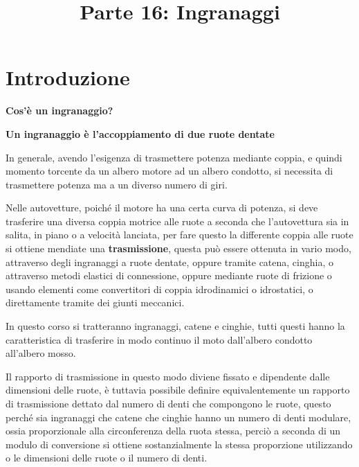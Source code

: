 \documentclass[a4paper, 15pt]{article}
\title{Parte 16: Ingranaggi}
\date{}
\begin{document}
		\maketitle
		\tableofcontents 
		\newpage
		
\section{Introduzione}		
\begin{adjustwidth}{2in}{} 
	\begin{center}
		\textbf{Cos'è un ingranaggio?}
	\end{center}  
	
	\begin{center}
		\textbf{Un ingranaggio è l'accoppiamento di due ruote dentate} \newline
	\end{center}
	
	In generale, avendo l'esigenza di trasmettere potenza mediante coppia, e quindi momento torcente da un albero motore ad un albero condotto, si necessita di trasmettere potenza ma a un diverso numero di giri. 
	
	Nelle autovetture, poiché il motore ha una certa curva di potenza, si deve trasferire una diversa coppia motrice alle ruote a seconda che l'autovettura sia in salita, in piano o a velocità lanciata, per fare questo la differente coppia alle ruote si ottiene mendiate una \textbf{trasmissione}, questa può essere ottenuta in vario modo, attraverso degli ingranaggi a ruote dentate, oppure tramite catena, cinghia, o attraverso metodi elastici di connessione, oppure mediante ruote di frizione o usando elementi come convertitori di coppia idrodinamici o idrostatici, o direttamente tramite dei giunti meccanici.\newline
	
	In questo corso si tratteranno ingranaggi, catene e cinghie, tutti questi hanno la caratteristica di trasferire in modo continuo il moto dall'albero condotto all'albero mosso. \newline
	
	Il rapporto di trasmissione in questo modo diviene fissato e dipendente dalle dimensioni delle ruote, è tuttavia possibile definire equivalentemente un rapporto di trasmissione dettato dal numero di denti che compongono le ruote, questo perché sia ingranaggi che catene che cinghie hanno un numero di denti modulare, ossia proporzionale alla circonferenza della ruota stessa, perciò a seconda di un modulo di conversione si ottiene sostanzialmente la stessa proporzione utilizzando o le dimensioni delle ruote o il numero di denti. \newline
	

\end{adjustwidth}
\end{document}
